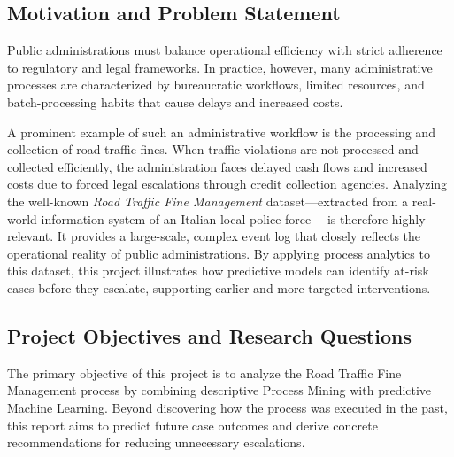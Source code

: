 
\subsection{Motivation and Problem Statement}
\label{sub:motivation}

Public administrations must balance operational efficiency with
strict adherence to regulatory and legal frameworks. In practice,
however, many administrative processes are characterized by
bureaucratic workflows, limited resources, and batch-processing
habits that cause delays and increased costs.

A prominent example of such an administrative workflow is the
processing and collection of road traffic fines. When traffic
violations are not processed and collected efficiently, the
administration faces delayed cash flows and increased costs due to
forced legal escalations through credit collection agencies.
Analyzing the well-known \textit{Road Traffic Fine Management}
dataset---extracted from a real-world information system of an Italian
local police force \parencite{deleoni2015}---is therefore highly
relevant. It provides a large-scale, complex event log that closely
reflects the operational reality of public administrations. By applying process analytics to this dataset, this project
illustrates how predictive models can identify at-risk cases
before they escalate, supporting earlier and more targeted
interventions.

\subsection{Project Objectives and Research Questions}
\label{sub:objectives}

The primary objective of this project is to analyze the Road
Traffic Fine Management process by combining descriptive Process
Mining \parencite{vanderaalst2016} with predictive Machine Learning.
Beyond discovering how the process was executed in the past, this
report aims to predict future case outcomes and derive concrete
recommendations for reducing unnecessary escalations.


